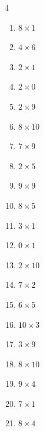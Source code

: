 \begin{multicols}{4}
\begin{enumerate}
  \item $8\times 1$
        \phantom{$=8$}

  \item $4\times 6$
        \phantom{$=24$}

  \item $2\times 1$
        \phantom{$=2$}

  \item $2\times 0$
        \phantom{$=0$}

  \item $2\times 9$
        \phantom{$=18$}

  \item $8\times 10$
        \phantom{$=80$}

  \item $7\times 9$
        \phantom{$=63$}

  \item $2\times 5$
        \phantom{$=10$}

\columnbreak %

  \item $9\times 9$
        \phantom{$=81$}

  \item $8\times 5$
        \phantom{$=40$}

  \item $3\times 1$
        \phantom{$=3$}

  \item $0\times 1$
        \phantom{$=0$}

  \item $2\times 10$
        \phantom{$=20$}

  \item $7\times 2$
        \phantom{$=14$}

  \item $6\times 5$
        \phantom{$=30$}

  \item $10\times 3$
        \phantom{$=30$}

  \item $3\times 9$
        \phantom{$=27$}

  \item $8\times 10$
        \phantom{$=80$}

  \item $9\times 4$
        \phantom{$=36$}

  \item $7\times 1$
        \phantom{$=7$}

  \item $8\times 4$
        \phantom{$=32$}


\end{enumerate}
\end{multicols}
